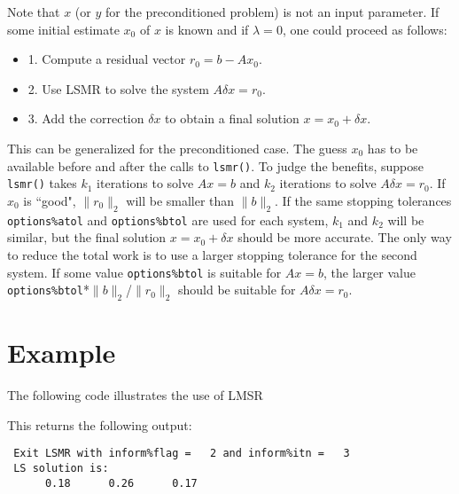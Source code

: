      Note that $x$ (or $y$ for the preconditioned problem) is not an input
     parameter.
     If some initial estimate $x_0$ of $x$ is known and if $\lambda = 0$,
     one could proceed as follows:
    \begin{itemize} 
     \item 1. Compute a residual vector     $r_0 = b - Ax_0$.
    \item 2. Use LSMR to solve the system  $A \delta x = r_0$.
    \item 3. Add the correction $\delta x$ to obtain a final solution $x = x_0 + \delta x$.
    \end{itemize}
     This can be generalized for the preconditioned case.
     The guess $x_0$ has to be available before and after the calls
     to {\tt lsmr()}.  To judge the benefits, suppose {\tt lsmr()} takes $k_1$ iterations
     to solve $Ax = b$ and $k_2$ iterations to solve $A \delta x = r_0$.
     If $x_0$ is ``good", $\|r_0\|_2$ will be smaller than $\|b\|_2$.
     If the same stopping tolerances {\tt options\%atol} and {\tt options\%btol}
      are used for each
     system, $k_1$ and $k_2$ will be similar, but the final solution $x = x_0 + \delta x$
     should be more accurate.  The only way to reduce the total work
     is to use a larger stopping tolerance for the second system.
     If some value {\tt options\%btol} is suitable for $Ax=b$, the larger value
     {\tt options\%btol}*$\|b\|_2$/$\|r_0\|_2$  should be suitable for $A \delta x = r_0$.
    




\section{Example}
The following code illustrates the use of LMSR



This returns the following output:

\begin{verbatim}
 Exit LSMR with inform%flag =   2 and inform%itn =   3
 LS solution is:
      0.18      0.26      0.17
\end{verbatim}

\begin{funders}
\end{funders}
